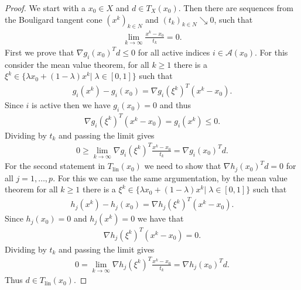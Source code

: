 \begin{proof}
    We start with a $x_0 \in X$ and $d \in T_X(x_0)$. Then there are
    sequences from the Bouligard tangent cone $(x^{k})_{k\in N}$ and
    $(t_k)_{k \in N} \searrow 0 $, such that
    \begin{align}
        \lim_{ k \to \infty} \frac{x^k-x_0}{t_k} = 0.
    \end{align}
    First we prove that $\nabla g_i(x_0)^{T} d \le 0$ for all active indices
    $i \in \mathcal{A}(x_0)$. For this consider the mean value theorem, for
    all $k\ge1$ there is a $\xi^{k}  \in \{\lambda x_0 + (1-\lambda) x^{k}|\;
    \lambda \in [0, 1]\} $ such that
    \begin{align}
        g_i(x^{k}) - g_i(x_0) = \nabla g_i(\xi^{k})^{T} (x^{k} - x_0).
    \end{align}
    Since $i$ is active then we have $g_i(x_0) = 0$ and thus
    \begin{align}
         \nabla g_i(\xi^{k})^{T} (x^{k} - x_0) = g_i(x^{k}) \le 0.
    \end{align}
    Dividing by $t_k$ and passing the limit gives
    \begin{align}
        0 \ge \lim_{k \to \infty} \nabla g_i(\xi^{k})^{T}  \frac{x^k-x_0}{t_k}
        = \nabla g_i(x_0)^{T} d.
    \end{align}
    For the second statement in $T_{\text{lin}}(x_0)$ we need to show that
    $\nabla h_j(x_0)^{T} d = 0$ for all $j=1,\ldots,p$. For this we can use
    the same argumentation, by the mean value theorem for
    all $k\ge1$ there is a $\xi^{k}  \in \{\lambda x_0 + (1-\lambda) x^{k}|\;
    \lambda \in [0, 1]\} $ such that
    \begin{align}
        h_j(x^{k}) - h_j(x_0) = \nabla h_j(\xi^{k})^{T} (x^{k} - x_0).
    \end{align}
    Since $h_j(x_0) = 0$ and $h_j(x^{k}) = 0$  we have that
    \begin{align}
        \nabla h_j(\xi^{k})^{T} (x^{k} - x_0) = 0.
    \end{align}
    Dividing by $t_k$ and passing the limit gives
    \begin{align}
        0 = \lim_{ k \to \infty} \nabla h_j(\xi^{k})^{T} \frac{x^{k} - x_0}
        {t_k}= \nabla h_j(x_0)^{T} d.
    \end{align}
    Thus $d \in T_{\text{lin}}(x_0)$.
\end{proof}

